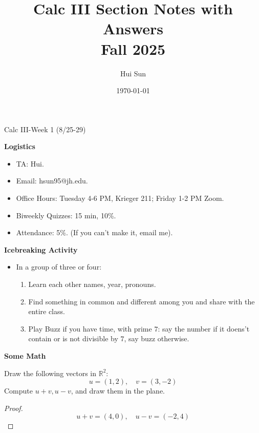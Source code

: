 \documentclass[openany]{book}
\title{Calc III Section Notes with Answers
\\ 
\vspace{0.4cm}
\large Fall 2025}
\date{\today}
\author{Hui Sun}
\newcommand{\R}{\mathbb{R}}
\begin{document}
\maketitle

\newpage


\begin{center}
    \Large Calc III-Week 1 (8/25-29)
\end{center}

\renewcommand\thesection{\arabic{section}}
\noindent
\textbf{Logistics}


\begin{itemize}
    \item TA: Hui.
    \item Email: hsun95@jh.edu.
    \item Office Hours: Tuesday 4-6 PM, Krieger 211; Friday 1-2 PM Zoom.
    \item Biweekly Quizzes: 15 min, 10\%.
    \item Attendance: 5\%. (If you can't make it, email me).
\end{itemize}

\noindent
\textbf{Icebreaking Activity}

\begin{itemize}
    \item In a group of three or four: 
    \begin{enumerate}
        \item Learn each other names, year, pronouns.
        \item Find something in common and different among you and share with the entire class.
        \item Play Buzz if you have time, with prime $7$: say the number if it doens't contain or is not divisible by $7$, say buzz otherwise.
    \end{enumerate}
\end{itemize}

\noindent
\textbf{Some Math}
\begin{prob}
    Draw the following vectors in $\R^2$:
    \begin{equation*}
        u=(1,2), \quad v=(3,-2)
    \end{equation*}
    Compute $u+v, u-v$, and draw them in the plane.
\end{prob}
\begin{proof}
    \begin{equation*}
        u+v=(4,0), \quad u-v=(-2, 4)
    \end{equation*}
\end{proof}
\end{document}
